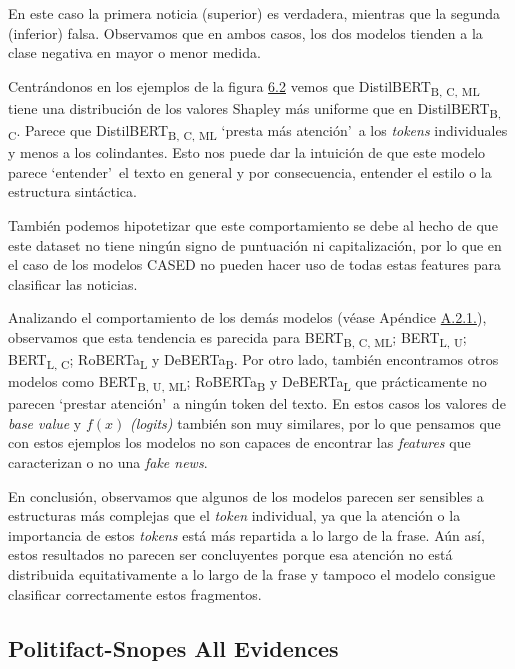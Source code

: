 En este caso la primera noticia (superior) es verdadera, mientras que la segunda (inferior) falsa. Observamos que en ambos casos, los dos modelos tienden a la clase negativa en mayor o menor medida. 

Centrándonos en los ejemplos de la figura \hyperref[fig:shap-ps-one]{6.2} vemos que {DistilBERT}\textsubscript{B, C, ML} tiene una distribución de los valores Shapley más uniforme que en {DistilBERT}\textsubscript{B, C}. Parece que {DistilBERT}\textsubscript{B, C, ML} `presta más atención'\ a los \textit{tokens} individuales y menos a los colindantes. Esto nos puede dar la intuición de que este modelo parece `entender'\ el texto en general y por consecuencia, entender el estilo o la estructura sintáctica. 

También podemos hipotetizar que este comportamiento se debe al hecho de que este dataset no tiene ningún signo de puntuación ni capitalización, por lo que en el caso de los modelos CASED no pueden hacer uso de todas estas features para clasificar las noticias.

Analizando el comportamiento de los demás modelos (véase Apéndice \hyperref[fig:shap-ps-one-annex]{A.2.1.}), observamos que esta tendencia es parecida para {BERT}\textsubscript{B, C, ML}; {BERT}\textsubscript{L, U}; {BERT}\textsubscript{L, C}; {RoBERTa}\textsubscript{L} y {DeBERTa}\textsubscript{B}. Por otro lado, también encontramos otros modelos como {BERT}\textsubscript{B, U, ML}; {RoBERTa}\textsubscript{B} y {DeBERTa}\textsubscript{L} que prácticamente no parecen `prestar atención'\ a ningún token del texto. En estos casos los valores de \textit{base value} y $f(x)$ \textit{(logits)} también son muy similares, por lo que pensamos que con estos ejemplos los modelos no son capaces de encontrar las \textit{features} que caracterizan o no una \textit{fake news}.

En conclusión, observamos que algunos de los modelos parecen ser sensibles a estructuras más complejas que el \textit{token} individual, ya que la atención o la importancia de estos \textit{tokens} está más repartida a lo largo de la frase. Aún así, estos resultados no parecen ser concluyentes porque esa atención no está distribuida equitativamente a lo largo de la frase y tampoco el modelo consigue clasificar correctamente estos fragmentos.

\subsection{Politifact-Snopes All Evidences}

